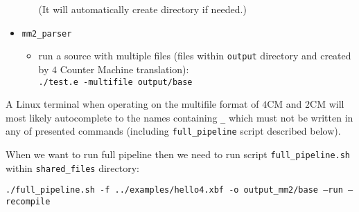 \documentclass[english,shortabstract,mgr]{iithesis}
\begin{document}
\begin{itemize}
\begin{itemize}
        (It will automatically create directory if needed.)
    \end{itemize}
  \item \texttt{mm2\_parser}
    \begin{itemize}
      \item run a source with multiple files (files within \texttt{output}
        directory and created by $4$ Counter Machine translation): \\ \texttt{./test.e -multifile output/base}
    \end{itemize}
\end{itemize}

A Linux terminal when operating on the multifile format of $4$CM and $2$CM will
most likely autocomplete to the names containing \texttt{\_} which must not
be written in any of presented commands (including \texttt{full\_pipeline} script described below).

When we want to run full pipeline then we need to run script \texttt{full\_pipeline.sh} within
\texttt{shared\_files} directory:

\hspace{-1.25cm}
\texttt{./full\_pipeline.sh -f ../examples/hello4.xbf -o output\_mm2/base --run --recompile}
\end{document}
